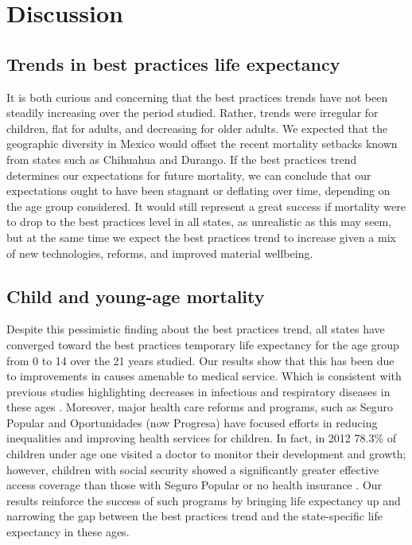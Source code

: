 \documentclass{article}
\begin{document}


\section*{Discussion}
\subsection*{Trends in best practices life expectancy}
It is both curious and concerning that the best practices trends have not been
steadily increasing over the period studied. Rather, trends were irregular for
children, flat for adults, and decreasing for older adults. We expected
that the geographic diversity in Mexico would offset the recent mortality
setbacks known from states such as Chihuahua and Durango. If the best practices
trend determines our expectations for future mortality, we can conclude that
our expectations ought to have been stagnant or deflating over time, depending
on the age group considered. It would still represent a great success if
mortality were to drop to the best practices level in all states, as unrealistic as this may seem, but at the same time we expect
the best practices trend to increase given a mix of new technologies, reforms,
and improved material wellbeing.

\subsection*{Child and young-age mortality}
Despite this pessimistic finding about the best practices trend, all states have
converged toward the best practices temporary life expectancy for the age group
from 0 to 14 over the 21 years studied. Our results show that this has been due to improvements in causes amenable to medical service. Which is consistent with previous studies highlighting decreases in infectious and respiratory diseases in these ages \citep{canudas2014}. Moreover, major health care reforms and programs, such as Seguro Popular and Oportunidades (now Progresa) have focused efforts in reducing inequalities and improving health services for children. In fact, in 2012 78.3\% of children under age one visited a doctor to monitor their development and growth; however, children with social security showed a significantly greater effective access coverage  than those with Seguro Popular or no health insurance \citep{urquieta2015evolution}. Our results reinforce the success of such programs by bringing life expectancy up and narrowing the gap between the best practices trend and the state-specific life expectancy in these ages.
\end{document}
